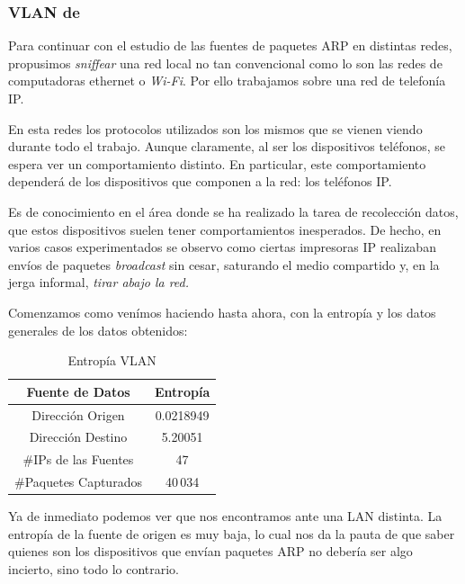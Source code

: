 \subsubsection{VLAN de~}
\par Para continuar con el estudio de las fuentes de paquetes ARP en distintas redes,
propusimos \textit{sniffear} una red local no tan convencional como lo son las
redes de computadoras ethernet o \textit{Wi-Fi}. Por ello trabajamos sobre una
red de telefon\'ia IP.

\par En esta redes los protocolos utilizados son los mismos que se vienen viendo
durante todo el trabajo. Aunque claramente, al ser los dispositivos tel\'efonos,
se espera ver un comportamiento distinto. En particular, este comportamiento
depender\'a de los dispositivos que componen a la red: los tel\'efonos IP.

\par Es de conocimiento en el \'area donde se ha realizado la tarea de recolecci\'on
datos, que estos dispositivos suelen tener comportamientos inesperados. De hecho,
en varios casos experimentados se observo como ciertas impresoras IP realizaban
env\'ios de paquetes \textit{broadcast} sin cesar, saturando el medio compartido
y, en la jerga informal, \textit{tirar abajo la red.}

\par Comenzamos como ven\'imos haciendo hasta ahora, con la entrop\'ia y los
datos generales de los datos obtenidos:

\begin{table}[!h]
\centering
  \begin{tabular}{c c}
    Fuente de Datos & Entrop\'ia \\
    \hline\hline
    Direcci\'on Origen & 0.0218949 \\
    Direcci\'on Destino & 5.20051 \\
    \hline\hline
    \#IPs de las Fuentes & 47\\
    \#Paquetes Capturados & 40\,034 \\
    \hline
    \end{tabular}
  \bigskip
  \caption{Entrop\'ia VLAN }
  \label{tab:vlan40_entropia}
\end{table}

\par Ya de inmediato podemos ver que nos encontramos ante una LAN distinta. La entrop\'ia
de la fuente de origen es muy baja, lo cual nos da la pauta de que saber quienes son
los dispositivos que env\'ian paquetes ARP no deber\'ia ser algo incierto, sino todo
lo contrario.

